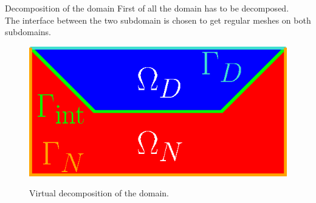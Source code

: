 \documentclass[aspectratio=169]{ISAE-Beamer}
\begin{document}
\begin{frame}{Decomposition of the domain}
First of all the domain has to be decomposed. \\

The interface between the two subdomain is chosen to get regular meshes on both subdomains.
\begin{figure}[t]%
\centering
\includegraphics[width=0.5\columnwidth]{part_3/applications/mixed_bd_waves/dom_split.eps} \\
\caption{Virtual decomposition of the domain.}
\end{figure}
\end{frame}
\end{document}

